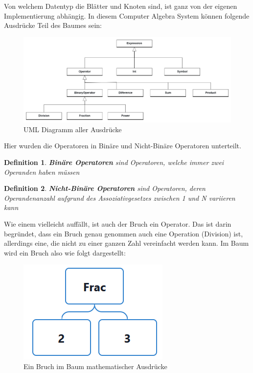 \documentclass[11pt]{article}
\newtheorem{defin}{Definition}
\begin{document}
Von welchem Datentyp die Blätter und Knoten sind, ist ganz von der eigenen Implementierung abhängig.
In diesem Computer Algebra System können folgende Ausdrücke Teil des Baumes sein:

\begin{figure}[h]
  \centering
  \includegraphics[scale=0.25]{UML_Ausdruecke.png}
  \caption{UML Diagramm aller Ausdrücke}
\end{figure}

Hier wurden die Operatoren in Binäre und Nicht-Binäre Operatoren unterteilt.
\begin{defin}
  \textbf{Binäre Operatoren} sind Operatoren, welche immer zwei Operanden haben müssen
\end{defin} 
\begin{defin}
  \textbf{Nicht-Binäre Operatoren} sind Operatoren, deren Operandenanzahl aufgrund des
  Assoziativgesetzes zwischen 1 und N variieren kann
\end{defin}

Wie einem vielleicht auffällt, ist auch der Bruch ein Operator. 
Das ist darin begründet, dass ein Bruch genau genommen auch eine Operation (Division) ist, 
allerdings eine, die nicht zu einer ganzen Zahl vereinfacht werden kann. 
Im Baum wird ein Bruch also wie folgt dargestellt:

\begin{figure}[h]
  \centering
  \includegraphics[scale=0.5]{trees/beispiel_baum_frac.png}
  \caption{Ein Bruch im Baum mathematischer Ausdrücke}
\end{figure}
\end{document}
